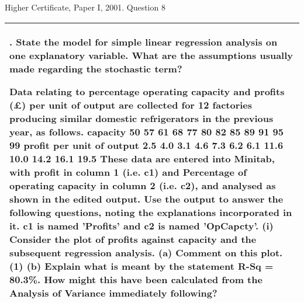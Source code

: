 \documentclass[a4paper,12pt]{article}
\begin{document}
Higher Certificate, Paper I, 2001. Question 8
\begin{table}[ht!]
     \centering
     \begin{tabular}{|p{15cm}|}
     \hline        
\noindent %
8. State the model for simple linear regression analysis on one explanatory variable.
What are the assumptions usually made regarding the stochastic term?

Data relating to percentage operating capacity and profits (£) per unit of output are
collected for 12 factories producing similar domestic refrigerators in the previous
year, as follows.
capacity
50 57 61 68 77 80 82 85 89 91 95 99
profit per unit
of output
2.5 4.0 3.1 4.6 7.3 6.2 6.1 11.6 10.0 14.2 16.1 19.5
These data are entered into Minitab, with profit in column 1 (i.e. c1) and
Percentage of operating capacity in column 2 (i.e. c2), and analysed as shown in the edited
output. Use the output to answer the following questions, noting the explanations
incorporated in it. c1 is named 'Profits' and c2 is named 'OpCapcty'.
(i) Consider the plot of profits against capacity and the subsequent regression
analysis.
(a) Comment on this plot.
(1)
(b) Explain what is meant by the statement R-Sq = 80.3\%. How might
this have been calculated from the Analysis of Variance
immediately following?
\\ \hline
      \end{tabular}
    \end{table}
\end{document}
